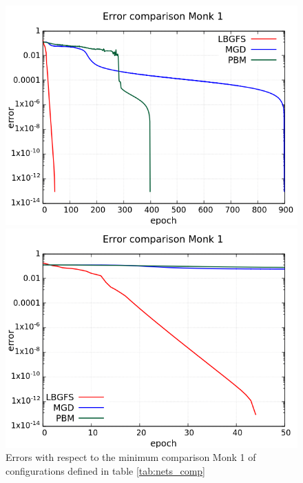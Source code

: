 \begin{figure}[H]
	\centering
	\begin{minipage}[t]{0.5\linewidth}
		\includegraphics[width=\linewidth]{data/Comparison/Monk1/Monk1_R_Comparison_log_standard.png}
	\end{minipage}%
	\begin{minipage}[t]{0.5\linewidth}
		\includegraphics[width=\linewidth]{data/Comparison/Monk1/Monk1_R_Comparison_log_zoom.png}
	\end{minipage}
	\caption{Errors with respect to the minimum comparison Monk 1 of configurations defined in table \ref{tab:nets_comp}}
	\label{R-Monk1}
\end{figure}
